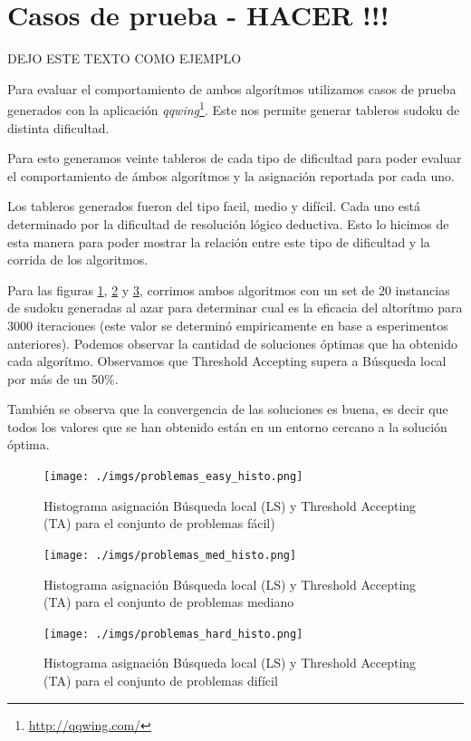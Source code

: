 \documentclass[a4paper,spanish]{article}
\begin{document}
\clearpage

\section{Casos de prueba - HACER !!!}

DEJO ESTE TEXTO COMO EJEMPLO

Para evaluar el comportamiento de ambos algorítmos utilizamos casos de prueba
generados con la aplicación \emph{qqwing}\footnote{\url{http://qqwing.com/}}. Este nos permite generar tableros
sudoku de distinta dificultad.

Para esto generamos veinte tableros de cada tipo de dificultad para poder
evaluar el comportamiento de ámbos algorítmos y la asignación reportada por cada
uno.

Los tableros generados fueron del tipo facil, medio y difícil. Cada uno está
determinado por la dificultad de resolución lógico deductiva. Esto lo hicimos de
esta manera para poder mostrar la relación entre este tipo de dificultad y la
corrida de los algoritmos.

Para las figuras  \ref{img:histo_easy}, \ref{img:histo_med} y
\ref{img:histo_hard}, corrimos ambos algoritmos con un set de 20 instancias de
sudoku generadas al azar para determinar cual es la eficacia del altorítmo para
3000 iteraciones (este valor se determinó empiricamente en base a esperimentos
anteriores).
Podemos observar la cantidad de soluciones óptimas que ha obtenido cada
algorítmo. Observamos que Threshold Accepting supera a Búsqueda local por más de
un 50\%.

También se observa que la convergencia de las soluciones es buena, es decir que
todos los valores que se han obtenido están en un entorno cercano a la solución
óptima.


\begin{center}
    \begin{figure}
        \texttt{[image: ./imgs/problemas\_easy\_histo.png]}
        \caption{Histograma asignación Búsqueda local (LS) y Threshold
        Accepting (TA) para el conjunto de problemas fácil)}
        \label{img:histo_easy}
    \end{figure}
\end{center}
\begin{center}
    \begin{figure}
        \texttt{[image: ./imgs/problemas\_med\_histo.png]}
        \caption{Histograma asignación Búsqueda local (LS) y Threshold
        Accepting (TA) para el conjunto de problemas mediano}
        \label{img:histo_med}
    \end{figure}
\end{center}
\begin{center}
    \begin{figure}
        \texttt{[image: ./imgs/problemas\_hard\_histo.png]}
        \caption{Histograma asignación Búsqueda local (LS) y Threshold
        Accepting (TA) para el conjunto de problemas difícil}
        \label{img:histo_hard}
    \end{figure}
\end{center}
\end{document}
